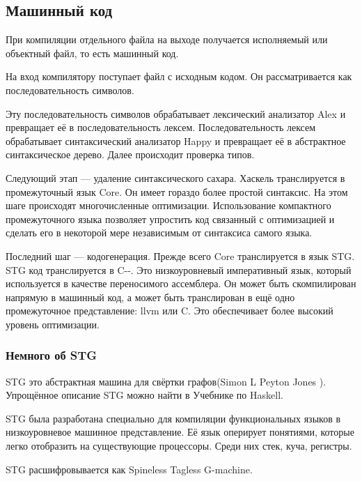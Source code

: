 \documentclass[fontsize=14pt, paper=a4, pagesize, DIV=calc]{scrartcl}
\begin{document}
\subsection{Машинный код}

При компиляции отдельного файла на выходе получается исполняемый или объектный
файл, то есть машинный код. 

На вход компилятору поступает файл с исходным кодом. Он рассматривается как 
последовательность символов.

Эту последовательность символов обрабатывает лексический анализатор Alex и
превращает её в последовательность лексем. Последовательность лексем
обрабатывает синтаксический анализатор Happy и превращает её в абстрактное
синтаксическое дерево. Далее происходит проверка типов.

Следующий этап --- удаление синтаксического сахара. Хаскель транслируется в
промежуточный язык Core. Он имеет гораздо более простой синтаксис. На этом шаге
происходят многочисленные оптимизации. Использование компактного промежуточного
языка позволяет упростить код связанный с оптимизацией и сделать его в
некоторой мере независимым от синтаксиса самого языка.

Последний шаг --- кодогенерация. Прежде всего Core транслируется в язык STG.
STG код транслируется в C-{}-. Это низкоуровневый императивный язык, который
используется в качестве переносимого ассемблера. Он может быть скомпилирован
напрямую в машинный код, а может быть транслирован в ещё одно промежуточное
представление: llvm или C. Это обеспечивает более высокий уровень оптимизации.

\subsubsection{Немного об STG}

STG это абстрактная машина для свёртки графов(Simon L Peyton Jones
\cite{funcOnStockHard}). Упрощённое описание STG можно найти в Учебнике по
Haskell\cite{ruhaskell}. 

STG была разработана специально для компиляции функциональных языков в
низкоуровневое машинное представление. Её язык оперирует понятиями, которые
легко отобразить на существующие процессоры. Среди них стек, куча, регистры. 

STG расшифровывается как Spineless Tagless G-machine.
\end{document}
